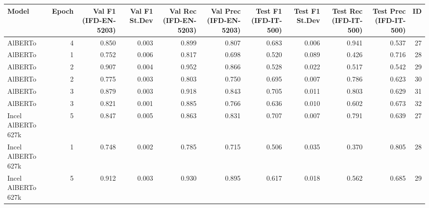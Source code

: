 \begin{tabular}{lrrrrrrrrrr}
\toprule
             Model &  Epoch &  Val F1 (IFD-EN-5203) &  Val F1 St.Dev &  Val Rec (IFD-EN-5203) &  Val Prec (IFD-EN-5203) &  Test F1 (IFD-IT-500) &  Test F1 St.Dev &  Test Rec (IFD-IT-500) &  Test Prec (IFD-IT-500) &  ID \\
\midrule
           AlBERTo &      4 &                 0.850 &          0.003 &                  0.899 &                   0.807 &                 0.683 &           0.006 &                  0.941 &                   0.537 &  27 \\
           AlBERTo &      1 &                 0.752 &          0.006 &                  0.817 &                   0.698 &                 0.520 &           0.089 &                  0.426 &                   0.716 &  28 \\
           AlBERTo &      2 &                 0.907 &          0.004 &                  0.952 &                   0.866 &                 0.528 &           0.022 &                  0.517 &                   0.542 &  29 \\
           AlBERTo &      2 &                 0.775 &          0.003 &                  0.803 &                   0.750 &                 0.695 &           0.007 &                  0.786 &                   0.623 &  30 \\
           AlBERTo &      3 &                 0.879 &          0.003 &                  0.918 &                   0.843 &                 0.705 &           0.011 &                  0.803 &                   0.629 &  31 \\
           AlBERTo &      3 &                 0.821 &          0.001 &                  0.885 &                   0.766 &                 0.636 &           0.010 &                  0.602 &                   0.673 &  32 \\
Incel AlBERTo 627k &      5 &                 0.847 &          0.005 &                  0.863 &                   0.831 &                 0.707 &           0.007 &                  0.791 &                   0.639 &  27 \\
Incel AlBERTo 627k &      1 &                 0.748 &          0.002 &                  0.785 &                   0.715 &                 0.506 &           0.035 &                  0.370 &                   0.805 &  28 \\
Incel AlBERTo 627k &      5 &                 0.912 &          0.003 &                  0.930 &                   0.895 &                 0.617 &           0.018 &                  0.562 &                   0.685 &  29 \\

\end{tabular}
